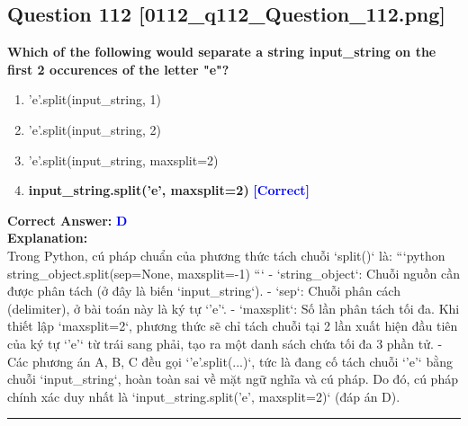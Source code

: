 \documentclass[11pt,a4paper]{article}
\begin{document}
\begin{minipage}{\textwidth}
\subsection*{Question 112 \quad \footnotesize{[0112_q112_Question_112.png]}}
\noindent \textbf{Which of the following would separate a string input_string on the first 2 occurences of the letter "e"?}

\begin{enumerate}[label=\Alph*.]
    \item 'e'.split(input_string, 1)
    \item 'e'.split(input_string, 2)
    \item 'e'.split(input_string, maxsplit=2)
    \item \textbf{input_string.split('e', maxsplit=2)} \hfill \textcolor{blue}{\textbf{[Correct]}}
\end{enumerate}

\noindent \textbf{Correct Answer:} \textcolor{blue}{\textbf{D}} \\[4pt]
\noindent \textbf{Explanation:}\\
Trong Python, cú pháp chuẩn của phương thức tách chuỗi `split()` là:\newline
```python\newline
string_object.split(sep=None, maxsplit=-1)\newline
```\newline
- `string_object`: Chuỗi nguồn cần được phân tách (ở đây là biến `input_string`).\newline
- `sep`: Chuỗi phân cách (delimiter), ở bài toán này là ký tự `'e'`.\newline
- `maxsplit`: Số lần phân tách tối đa. Khi thiết lập `maxsplit=2`, phương thức sẽ chỉ tách chuỗi tại 2 lần xuất hiện đầu tiên của ký tự `'e'` từ trái sang phải, tạo ra một danh sách chứa tối đa 3 phần tử.\newline
- Các phương án A, B, C đều gọi `'e'.split(...)`, tức là đang cố tách chuỗi `'e'` bằng chuỗi `input_string`, hoàn toàn sai về mặt ngữ nghĩa và cú pháp.\newline
Do đó, cú pháp chính xác duy nhất là `input_string.split('e', maxsplit=2)` (đáp án D).
\end{minipage}
\vspace{0.8cm}
\hrule
\vspace{0.5cm}
\end{document}

